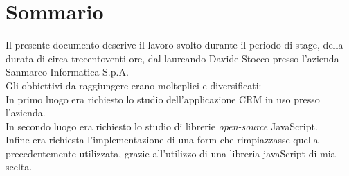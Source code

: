 
\cleardoublepage
{}
{}
\begingroup
\let\clearpage\relax
\let\cleardoublepage\relax
\let\cleardoublepage\relax

\chapter*{Sommario}

Il presente documento descrive il lavoro svolto durante il periodo di stage, della durata di circa trecentoventi ore, dal laureando Davide Stocco presso l'azienda Sanmarco Informatica S.p.A.\\
Gli obbiettivi da raggiungere erano molteplici e diversificati:\\
In primo luogo era richiesto lo studio dell'applicazione CRM in uso presso l'azienda.\\
In secondo luogo era richiesto lo studio di librerie \emph{open-source} JavaScript.\\
Infine era richiesta l'implementazione di una form che rimpiazzasse quella precedentemente utilizzata, grazie all'utilizzo di una libreria javaScript di mia scelta. 

%
%

\endgroup			

\vfill

